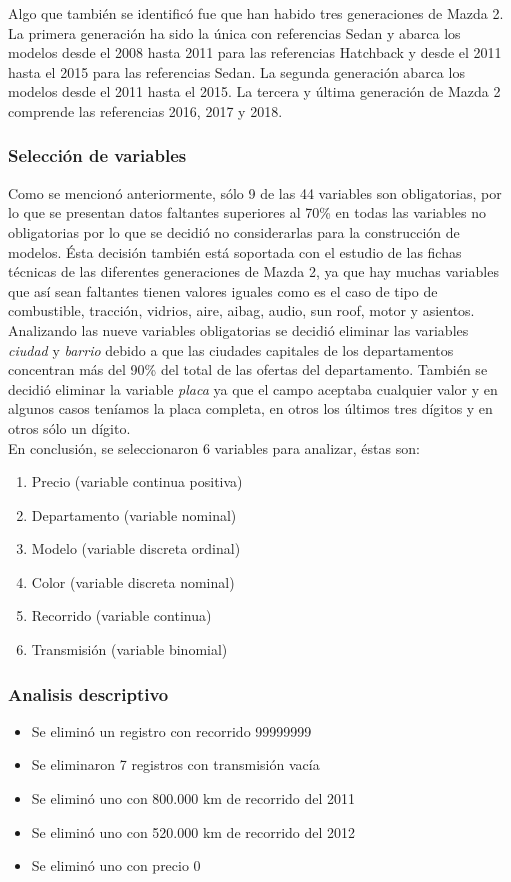 \documentclass[a4paper]{article}
\begin{document}
Algo que también se identificó fue que han habido tres generaciones de Mazda 2. La primera generación ha sido la única con referencias Sedan y abarca los modelos desde el 2008 hasta 2011 para las referencias Hatchback y desde el 2011 hasta el 2015 para las referencias Sedan. La segunda generación abarca los modelos desde el 2011 hasta el 2015. La tercera y última generación de Mazda 2 comprende las referencias 2016, 2017 y 2018.

\subsubsection{Selección de variables}
Como se mencionó anteriormente, sólo 9 de las 44 variables son obligatorias, por lo que se presentan datos faltantes superiores al 70\% en todas las variables no obligatorias por lo que se decidió no considerarlas para la construcción de modelos. Ésta decisión también está soportada con el estudio de las fichas técnicas de las diferentes generaciones de Mazda 2, ya que hay muchas variables que así sean faltantes tienen valores iguales como es el caso de tipo de combustible, tracción, vidrios, aire, aibag, audio, sun roof, motor y asientos.\\

Analizando las nueve variables obligatorias se decidió eliminar las variables \textit{ciudad} y \textit{barrio} debido a que las ciudades capitales de los departamentos concentran más del 90\% del total de las ofertas del departamento. También se decidió eliminar la variable \textit{placa} ya que el campo aceptaba cualquier valor y en algunos casos teníamos la placa completa, en otros los últimos tres dígitos y en otros sólo un dígito.\\

En conclusión, se seleccionaron 6 variables para analizar, éstas son:
\begin{enumerate}
\item Precio (variable continua positiva)
\item Departamento (variable nominal)
\item Modelo (variable discreta ordinal)
\item Color (variable discreta nominal)
\item Recorrido (variable continua)
\item Transmisión (variable binomial)
\end{enumerate}
\subsubsection{Analisis descriptivo}
\begin{itemize}
\item Se eliminó un registro con recorrido 99999999
\item Se eliminaron 7 registros con transmisión vacía
\item Se eliminó uno con 800.000 km de recorrido del 2011
\item Se eliminó uno con 520.000 km de recorrido del 2012
\item Se eliminó uno con precio 0
\end{itemize}
\end{document}
